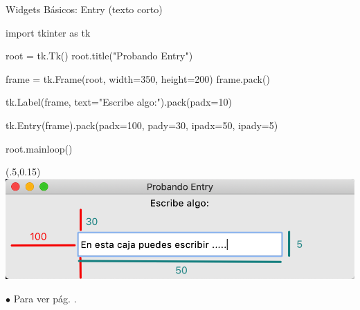 \documentclass[10pt, envcountsect , spanish]{beamer}
\begin{document}
\begin{frame}[fragile]{Widgets Básicos: Entry  (texto corto)}
{}

\begin{pyverbatim}[][frame=single]
import tkinter as tk

root = tk.Tk()
root.title("Probando Entry")

frame = tk.Frame(root, width=350, height=200)
frame.pack()

tk.Label(frame, text="Escribe algo:").pack(padx=10)


tk.Entry(frame).pack(padx=100, pady=30, ipadx=50, ipady=5)


root.mainloop()
\end{pyverbatim}

\begin{textblock*}{.5\textwidth}(.5\textwidth,0.15\textheight)
\includegraphics[width=\textwidth]{fig/entry}
\end{textblock*}


{\scriptsize $\bullet$
Para  ver pág. \pageref{pack}.
}
\end{frame}
\end{document}

